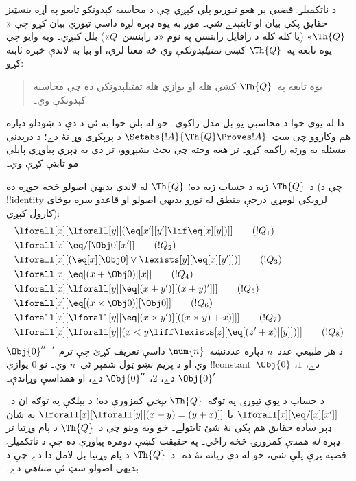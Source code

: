 \documentclass[../../../include/open-logic-section]{subfiles}
\begin{document}

د ناتکميلۍ قضيې پر هغو تيوريو پلي کېږي چې د محاسبه کېدونکو تابعو
په اړه بنسټيز حقايق پکې بيان او ثابتېدے شي۔ موږ به يوه ډېره لږه
داسې تيوري بيان کړو چې «$\Th{Q}$» (يا کله کله د رافايل رابنسن په
نوم «د رابنسن~$Q$») بلل کېږي۔ وبه وايو چې يوه تابعه په~$\Th{Q}$
کښې
\emph{تمثيلېدونکې} وي څه معنا لري، او بيا به لاندې خبره ثابته کړو:
\begin{quote}
  يوه تابعه په~$\Th{Q}$ کښې هله او يوازې هله تمثيلېدونکې ده چې
  محاسبه کېدونکې وي۔
\end{quote}
دا له يوې خوا د محاسبې يو بل مدل راکوي۔ خو له بلې خوا به ئې د دې د
ښودلو دپاره هم وکاروو چې سټ~$\Setabs{!A}{\Th{Q} \Proves !A}$ د
پرېکړې وړ نۀ دے؛ د درېدنې مسئله به ورته راکمه کړو۔ تر هغه وخته چې
بحث بشپړوو، تر دې به ډېرې پياوړې پايلې مو ثابتې کړې وي۔

د~$\Th{Q}$ ژبه د حساب ژبه ده؛ $\Th{Q}$ له لاندې بديهي اصولو څخه
جوړه ده (چې د !!{identity} لرونکي لومړۍ درجې منطق له نورو بديهي
اصولو او قاعدو سره يوځای کارول کېږي):
\begin{align*}
& \lforall[x][\lforall[y][(\eq[x'][y'] \lif \eq[x][y])]] \tag{$!Q_1$}\\
& \lforall[x][\eq/[\Obj 0][x']] \tag{$!Q_2$}\\
& \lforall[x][(\eq[x][\Obj 0] \lor \lexists[y][\eq[x][y']])] \tag{$!Q_3$}\\
& \lforall[x][\eq[(x + \Obj 0)][x]] \tag{$!Q_4$}\\
& \lforall[x][\lforall[y][\eq[(x + y')][(x + y)']]] \tag{$!Q_5$}\\
& \lforall[x][\eq[(x \times \Obj 0)][\Obj 0]] \tag{$!Q_6$}\\
& \lforall[x][\lforall[y][\eq[(x \times y')][((x \times y) + x)]]] \tag{$!Q_7$}\\
& \lforall[x][\lforall[y][(x < y \liff \lexists[z][\eq[(z' + x)][y]])]] \tag{$!Q_8$}
\end{align*}
د هر طبيعي عدد~$n$ دپاره عددنښه~$\num{n}$ داسې تعريف کړئ چې ترم
$\Obj{0}^{\prime\prime\ldots\prime}$ وي او د پريم نښو ټول شمېر ئې~$n$ وي۔ نو
$\num{0}$ يوازې !!{constant}~$\Obj{0}$ دے، $\num{1}$،
$\Obj{0}'$ دے، $\num{2}$، $\Obj{0}''$ دے، او همداسې وړاندې۔

د حساب د يوې تيورۍ په توګه~$\Th{Q}$ \emph{بېخي} کمزورې ده؛ د
بېلګې په توګه ان د~$\lforall[x][\eq/[x][x']]$ يا
$\lforall[x][\lforall[y][(x + y) = (y + x)]]$ په شان ډېر ساده
حقايق هم پکې نۀ شئ ثابتولے۔ خو وبه وينو چې د~$\Th{Q}$ د پام وړتيا
تر ډېره \emph{له همدې} کمزورۍ څخه راځي۔ په حقيقت کښې دومره پياوړې
ده چې د ناتکميلۍ قضيه پرې پلې شي، خو له دې زياته نۀ ده۔ د~$\Th{Q}$
د پام وړتيا بل لامل دا دے چې د بديهي اصولو سټ ئې \emph{متناهي} دے۔
\end{document}
